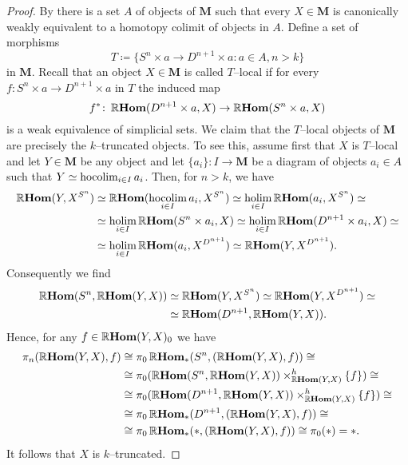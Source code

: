 \begin{proof}
  By \cite[Prop.~4.7]{mr1870516} there is a set \(A\) of objects of \(\mathbf{M}\) such that every \(X\in\mathbf{M}\) is canonically weakly equivalent to a homotopy colimit of objects in \(A\). Define a set of morphisms
  \[T \coloneqq \{S^{n}\times a \to D^{n+1}\times a : a\in A, n > k \}\]
  in \(\mathbf{M}\). Recall that an object \(X\in\mathbf{M}\) is called \(T\)--local if for every \(f\colon S^{n}\times a\to D^{n+1}\times a\) in \(T\) the induced map
  \[f^{*}\colon \RHom(D^{n+1}\times a, X)\to\RHom(S^{n}\times a, X)\]
  is a weak equivalence of simplicial sets. We claim that the \(T\)--local objects of \(\mathbf{M}\) are precisely the \(k\)--truncated objects. To see this, assume first that \(X\) is \(T\)--local and let \(Y\in\mathbf{M}\) be any object and let \(\{a_{i}\}\colon I\to\mathbf{M}\) be a diagram of objects \(a_{i}\in A\) such that \(Y\simeq \hocolim_{i\in I} a_{i}\). Then, for \(n>k\), we have
  \begin{align*}
    \RHom(Y, X^{S^{n}}) &\simeq \RHom(\hocolim_{i\in I}a_{i}, X^{S^{n}})\simeq \holim_{i\in I}\RHom(a_{i}, X^{S^{n}}) \simeq \\
                        &\simeq \holim_{i\in I} \RHom(S^{n}\times a_{i}, X) \simeq \holim_{i\in I}\RHom(D^{n+1}\times a_{i}, X)\simeq \\
                        &\simeq \holim_{i\in I}\RHom(a_{i}, X^{D^{n+1}})\simeq \RHom(Y, X^{D^{n+1}}).
  \end{align*}
  Consequently we find
  \begin{align*}
    \RHom(S^{n}, \RHom(Y, X)) & \simeq \RHom(Y, X^{S^{n}}) \simeq \RHom(Y, X^{D^{n+1}}) \simeq\\
                              &\simeq \RHom(D^{n+1}, \RHom(Y, X)).
  \end{align*}
  Hence, for any \(f\in\RHom(Y,X)_{0}\) we have
  \begin{align*}
    \pi_{n}(\RHom(Y, X), f) &\cong \pi_{0}\RHom_{*}(S^{n}, (\RHom(Y,X), f)) \cong \\
                            &\cong \pi_{0}(\RHom(S^{n}, \RHom(Y,X))\times^{h}_{\RHom(Y,X)}\{f\}) \cong \\
                            &\cong \pi_{0}(\RHom(D^{n+1}, \RHom(Y,X))\times^{h}_{\RHom(Y,X)}\{f\}) \cong \\
                            &\cong \pi_{0}\RHom_{*}(D^{n+1}, (\RHom(Y,X), f)) \cong \\
                            &\cong \pi_{0}\RHom_{*}(*, (\RHom(Y,X), f)) \cong \pi_{0}(*) = *.
  \end{align*}
  It follows that \(X\) is \(k\)--truncated.


\end{proof}
